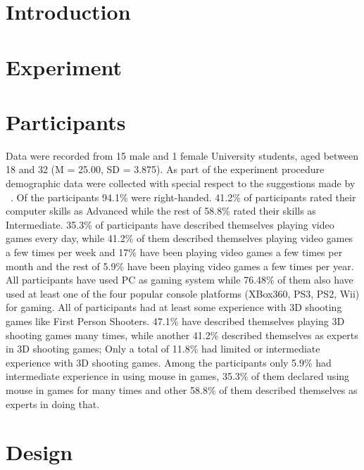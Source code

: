 \documentclass{uofsthesis-cs}
\begin{document}

\section{Introduction}

\section{Experiment}


\section{Participants}
Data were recorded from 15 male and 1 female University students, aged between 18 and 32 (M = 25.00, SD = 3.875). As part of the experiment procedure demographic data were collected with special respect to the suggestions made by ~\cite{?}. Of the participants 94.1\% were right-handed. 41.2\% of participants rated their computer skills as Advanced while the rest of 58.8\% rated their skills as Intermediate. 35.3\% of participants have described themselves playing video games every day, while 41.2\% of them described themselves playing video games a few times per week and 17\% have been playing video games a few times per month and the rest of 5.9\% have been playing video games a few times per year. All participants have used PC as gaming system while 76.48\% of them also have used at least one of the four popular console platforms (XBox360, PS3, PS2, Wii) for gaming. All of participants had at least some experience with 3D shooting games like First Person Shooters. 47.1\% have described themselves playing 3D shooting games many times, while another 41.2\% described themselves as experts in 3D shooting games; Only a total of 11.8\% had limited or intermediate experience with 3D shooting games. Among the participants only 5.9\% had intermediate experience in using mouse in games, 35.3\% of them declared using mouse in games for many times and other 58.8\% of them described themselves as experts in doing that.

\section{Design}
\end{document}
